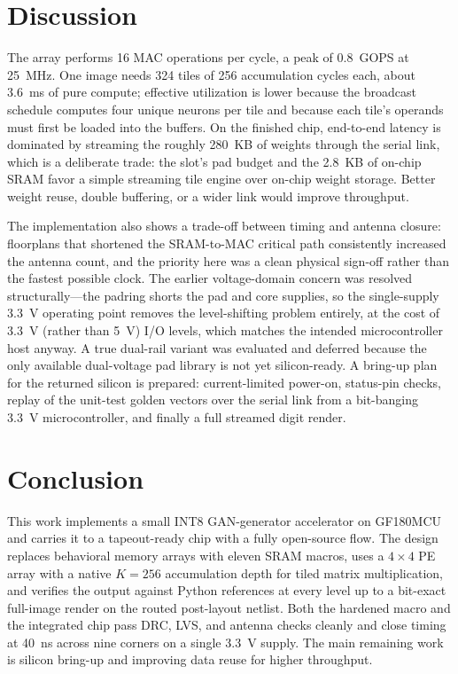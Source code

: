 \documentclass[conference,a4paper]{APSIPA2026}
\begin{document}
\section{Discussion}\label{sec:disc}
The array performs 16 MAC operations per cycle, a peak of 0.8~GOPS at 25~MHz. One image needs 324 tiles of 256 accumulation cycles each, about 3.6~ms of pure compute; effective utilization is lower because the broadcast schedule computes four unique neurons per tile and because each tile's operands must first be loaded into the buffers. On the finished chip, end-to-end latency is dominated by streaming the roughly 280~KB of weights through the serial link, which is a deliberate trade: the slot's pad budget and the 2.8~KB of on-chip SRAM favor a simple streaming tile engine over on-chip weight storage. Better weight reuse, double buffering, or a wider link would improve throughput.

The implementation also shows a trade-off between timing and antenna closure: floorplans that shortened the SRAM-to-MAC critical path consistently increased the antenna count, and the priority here was a clean physical sign-off rather than the fastest possible clock. The earlier voltage-domain concern was resolved structurally---the padring shorts the pad and core supplies, so the single-supply 3.3~V operating point removes the level-shifting problem entirely, at the cost of 3.3~V (rather than 5~V) I/O levels, which matches the intended microcontroller host anyway. A true dual-rail variant was evaluated and deferred because the only available dual-voltage pad library is not yet silicon-ready. A bring-up plan for the returned silicon is prepared: current-limited power-on, status-pin checks, replay of the unit-test golden vectors over the serial link from a bit-banging 3.3~V microcontroller, and finally a full streamed digit render.

\section{Conclusion}\label{sec:concl}
This work implements a small INT8 GAN-generator accelerator on GF180MCU and carries it to a tapeout-ready chip with a fully open-source flow. The design replaces behavioral memory arrays with eleven SRAM macros, uses a $4\times4$ PE array with a native $K{=}256$ accumulation depth for tiled matrix multiplication, and verifies the output against Python references at every level up to a bit-exact full-image render on the routed post-layout netlist. Both the hardened macro and the integrated chip pass DRC, LVS, and antenna checks cleanly and close timing at 40~ns across nine corners on a single 3.3~V supply. The main remaining work is silicon bring-up and improving data reuse for higher throughput.
\end{document}
